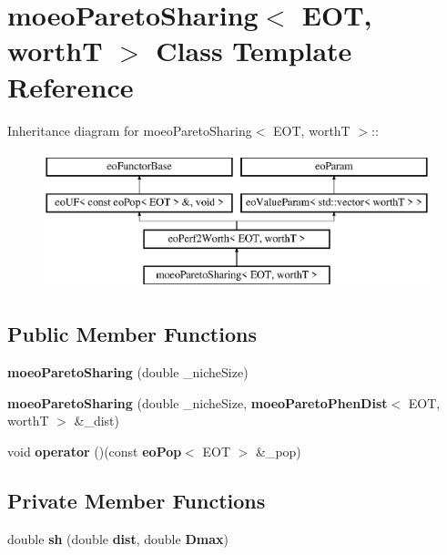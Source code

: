 \section{moeo\-Pareto\-Sharing$<$ EOT, worth\-T $>$ Class Template Reference}
\label{classmoeoParetoSharing}
Inheritance diagram for moeo\-Pareto\-Sharing$<$ EOT, worth\-T $>$::\begin{figure}[H]
\begin{center}
\leavevmode
\includegraphics[height=4cm]{classmoeoParetoSharing}
\end{center}
\end{figure}
\subsection*{Public Member Functions}
\begin{CompactItemize}
\item 
{\bf moeo\-Pareto\-Sharing} (double \_\-niche\-Size)\label{classmoeoParetoSharing_e2bb92004d3ec5193c7c3efcd499c489}

\item 
{\bf moeo\-Pareto\-Sharing} (double \_\-niche\-Size, {\bf moeo\-Pareto\-Phen\-Dist}$<$ EOT, worth\-T $>$ \&\_\-dist)\label{classmoeoParetoSharing_757d64059315641796855d5adc48cce9}

\item 
void {\bf operator} ()(const {\bf eo\-Pop}$<$ EOT $>$ \&\_\-pop)\label{classmoeoParetoSharing_67f211b508194562903dae15989ab515}

\end{CompactItemize}
\subsection*{Private Member Functions}
\begin{CompactItemize}
\item 
double {\bf sh} (double {\bf dist}, double {\bf Dmax})\label{classmoeoParetoSharing_002e355f0df0ad242cdf171207b592ac}

\end{CompactItemize}
